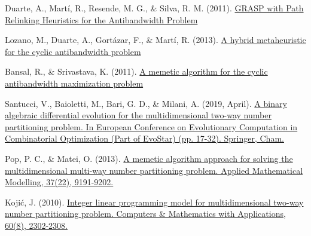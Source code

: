
\begin{thebibliography}{9}


	Duarte, A., Martí, R., Resende, M. G., \& Silva, R. M. (2011). \href{https://onlinelibrary.wiley.com/doi/full/10.1002/net.20418}{GRASP with Path Relinking Heuristics for the Antibandwidth Problem }


	Lozano, M., Duarte, A., Gortázar, F., \& Martí, R. (2013). \href{https://www.sciencedirect.com/science/article/pii/S0950705113002621}{A hybrid metaheuristic for the cyclic antibandwidth problem}


	Bansal, R., \& Srivastava, K. (2011). \href{https://link.springer.com/article/10.1007/s00500-009-0538-6}{A memetic algorithm for the cyclic antibandwidth maximization problem}


	Santucci, V., Baioletti, M., Bari, G. D., \& Milani, A. (2019, April). \href{https://link.springer.com/chapter/10.1007/978-3-030-16711-0_2}{A binary algebraic differential evolution for the multidimensional two-way number partitioning problem. In European Conference on Evolutionary Computation in Combinatorial Optimization (Part of EvoStar) (pp. 17-32). Springer, Cham.}


	Pop, P. C., \& Matei, O. (2013). \href{https://www.researchgate.net/profile/Oliviu-Matei/publication/299673724_A_Genetic_Algorithm_Approach_for_the_Multidimensional_Two-Way_Number_Partitioning_Problem/links/620df2d5f02286737ca4cd03/A-Genetic-Algorithm-Approach-for-the-Multidimensional-Two-Way-Number-Partitioning-Problem.pdf}{A memetic algorithm approach for solving the multidimensional multi-way number partitioning problem. Applied Mathematical Modelling, 37(22), 9191-9202.}


	Kojić, J. (2010). \href{https://www.sciencedirect.com/science/article/pii/S0898122110005882}{Integer linear programming model for multidimensional two-way number partitioning problem. Computers & Mathematics with Applications, 60(8), 2302-2308.}

\end{thebibliography}
